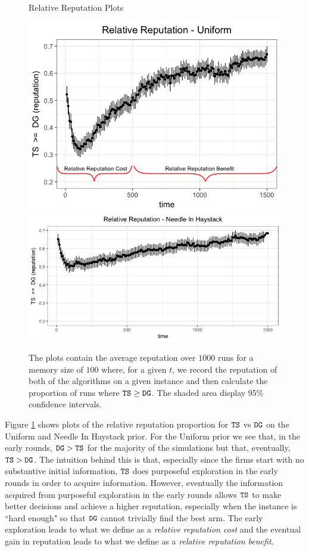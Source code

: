 \documentclass[../competing_bandits.tex]{subfiles}
\begin{document}
{\begin{figure}[ht]
\caption{Relative Reputation Plots}
\includegraphics[scale=0.35]{figures/relative_uniform_annotated_plot}
\includegraphics[scale=0.35]{figures/ts_dg_nih_10_prelim}
\caption*{\tiny{The plots contain the average reputation over $1000$ runs for a memory size of $100$ where, for a given $t$, we record the reputation of both of the algorithms on a given instance and then calculate the proportion of runs where $\mathtt{TS} \geq \mathtt{DG}$. The shaded area display 95\% confidence intervals.}}
\label{relative_rep_plots}

\end{figure}



Figure \ref{relative_rep_plots} shows plots of the relative reputation proportion for $\mathtt{TS}$ vs $\mathtt{DG}$ on the Uniform and Needle In Haystack prior. For the Uniform prior we see that, in the early rounds, $\mathtt{DG} > \mathtt{TS}$ for the majority of the simulations but that, eventually, $\mathtt{TS} > \mathtt{DG}$. The intuition behind this is that, especially since the firms start with no substantive initial information, $\mathtt{TS}$ does purposeful exploration in the early rounds in order to acquire information. However, eventually the information acquired from purposeful exploration in the early rounds allows $\mathtt{TS}$ to make better decisions and achieve a higher reputation, especially when the instance is ``hard enough" so that $\mathtt{DG}$ cannot trivially find the best arm. The early exploration leads to what we define as a \textit{relative reputation cost} and the eventual gain in reputation leads to what we define as a \textit{relative reputation benefit}.



}
\end{document}
